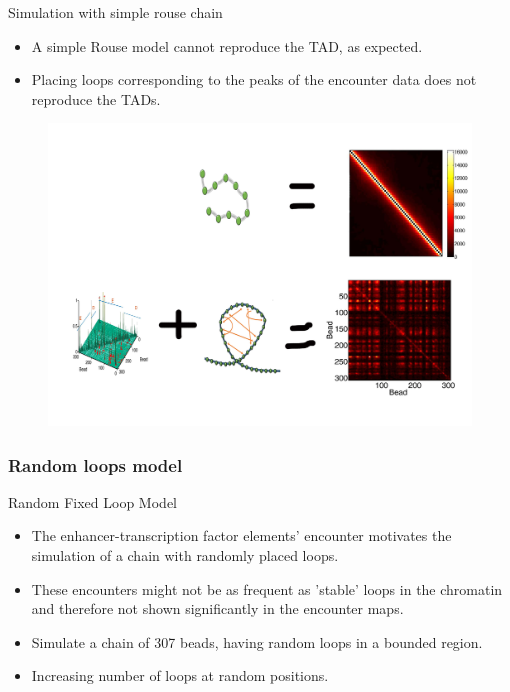 \documentclass[8pt]{beamer}
\begin{document}
\begin{frame}{Simulation with simple rouse chain}
\begin{itemize}
\item A simple Rouse model cannot reproduce the TAD, as expected.
\item Placing loops corresponding to the peaks of the encounter data does not reproduce the TADs. 
\end{itemize}
\begin{figure}[H]
\includegraphics[scale=0.4]{simulationWithSimpleRouseExperimentalData}
\end{figure}
\end{frame}

\subsubsection{Random loops model}\label{subsubsection_randomLoopsModel}

\begin{frame}{Random Fixed Loop Model}
\begin{itemize}
\item The enhancer-transcription factor elements' encounter motivates the simulation of a chain with randomly placed loops.
\item These encounters might not be as frequent as 'stable' loops in the chromatin and therefore not shown significantly in the encounter maps.
\item Simulate a chain of 307 beads, having random loops in a bounded region.
\item Increasing number of loops at random positions. 
\end{itemize}

\end{frame}
\end{document}
